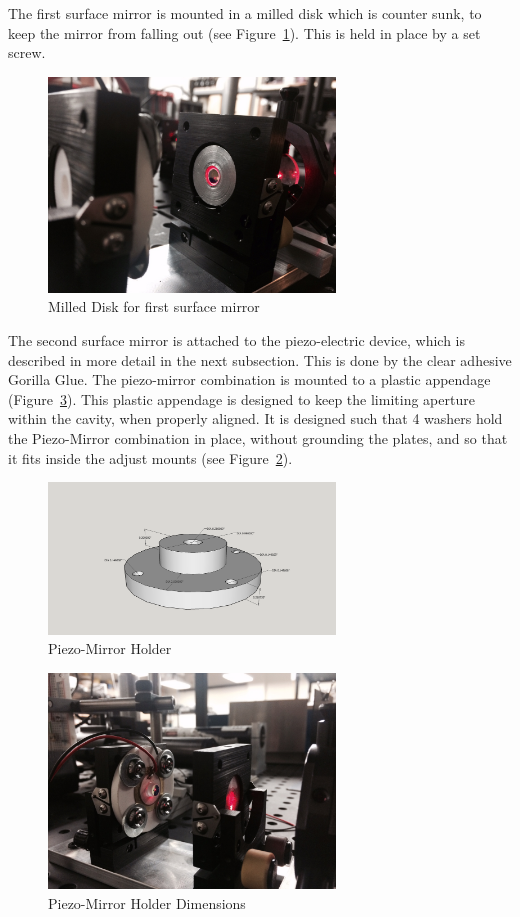 \documentclass[12pt,journal]{IEEEtran}
\begin{document}
The first surface mirror is mounted in a milled disk which is counter sunk, to keep the mirror from falling out (see Figure~\ref{fig:fsm}). This is held in place by a set screw. 

\begin{figure}[h!]
  \centering
	\includegraphics[width=3in]{first-lens-holder.png}
	\caption{Milled Disk for first surface mirror}
	\label{fig:fsm}
\end{figure}

The second surface mirror is attached to the piezo-electric device, which is described in more detail in the next subsection. This is done by the clear adhesive Gorilla Glue. The piezo-mirror combination is mounted to a plastic appendage (Figure~\ref{fig:holder}). This plastic appendage is designed to keep the limiting aperture within the cavity, when properly aligned. It is designed such that 4 washers hold the Piezo-Mirror combination in place, without grounding the plates, and so that it fits inside the adjust mounts (see Figure~\ref{fig:plastic-mount-piezo-mirror}).  

\begin{figure}[h!]
   \centering
   	\includegraphics[width=3in]{./mechanical/PZT_holder_3d_rep.png}
	\caption{Piezo-Mirror Holder}
	\label{fig:plastic-mount-piezo-mirror}
\end{figure}

\begin{figure}[h!]
  \centering
	\includegraphics[width=3in]{second-surface-holder.png}
	\caption[Second-Surface Piezo-Mirror Holder]{Piezo-Mirror Holder Dimensions}
	\label{fig:holder}
\end{figure}
\end{document}
